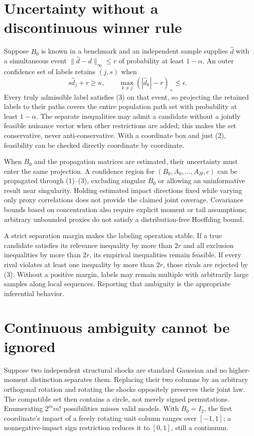 \documentclass[11pt,a4paper]{article}
\begin{document}
\section{Uncertainty without a discontinuous winner rule}
Suppose $B_0$ is known in a benchmark and an independent sample supplies $\widehat d$ with a simultaneous event
$\|\widehat d-d\|_\infty\le r$ of probability at least $1-\alpha$. An outer confidence set of labels retains $(j,s)$ when
\[
 s\widehat d_j+r\ge\kappa,\qquad
 \max_{k\ne j} (|\widehat d_k|-r)_+\le\epsilon. \tag{3}
\]
Every truly admissible label satisfies (3) on that event, so projecting the retained labels to their paths covers the entire population path set with probability at least $1-\alpha$. The separate inequalities may admit a candidate without a jointly feasible nuisance vector when other restrictions are added; this makes the set conservative, never anti-conservative. With a coordinate box and just (2), feasibility can be checked directly coordinate by coordinate.

When $B_0$ and the propagation matrices are estimated, their uncertainty must enter the same projection. A confidence region for $(B_0,A_0,\ldots,A_H,c)$ can be propagated through (1)--(3), excluding singular $B_0$ or allowing an uninformative result near singularity. Holding estimated impact directions fixed while varying only proxy correlations does not provide the claimed joint coverage. Covariance bounds based on concentration also require explicit moment or tail assumptions; arbitrary unbounded proxies do not satisfy a distribution-free Hoeffding bound.

A strict separation margin makes the labeling operation stable. If a true candidate satisfies its relevance inequality by more than $2r$ and all exclusion inequalities by more than $2r$, its empirical inequalities remain feasible. If every rival violates at least one inequality by more than $2r$, those rivals are rejected by (3). Without a positive margin, labels may remain multiple with arbitrarily large samples along local sequences. Reporting that ambiguity is the appropriate inferential behavior.

\section{Continuous ambiguity cannot be ignored}
Suppose two independent structural shocks are standard Gaussian and no higher-moment distinction separates them. Replacing their two columns by an arbitrary orthogonal rotation and rotating the shocks oppositely preserves their joint law. The compatible set then contains a circle, not merely signed permutations. Enumerating $2^m m!$ possibilities misses valid models. With $B_0=I_2$, the first coordinate's impact of a freely rotating unit column ranges over $[-1,1]$; a nonnegative-impact sign restriction reduces it to $[0,1]$, still a continuum.
\end{document}
